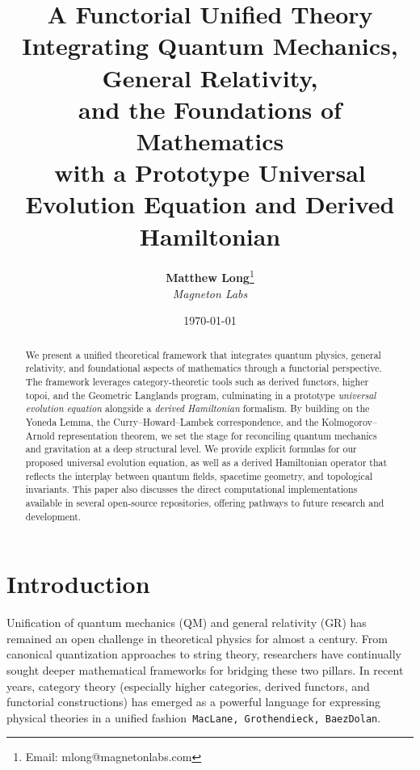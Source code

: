 \documentclass[11pt]{article}
\title{\textbf{A Functorial Unified Theory Integrating Quantum Mechanics, General Relativity,\\
and the Foundations of Mathematics\\
\large with a Prototype Universal Evolution Equation and Derived Hamiltonian}}
\author{
  \textbf{Matthew Long}\thanks{Email: mlong@magnetonlabs.com} \\
  \textit{Magneton Labs}
}
\date{\today}
\begin{document}
\maketitle

\begin{abstract}
We present a unified theoretical framework that integrates quantum physics, general relativity, and foundational aspects of mathematics through a functorial perspective. The framework leverages category-theoretic tools such as derived functors, higher topoi, and the Geometric Langlands program, culminating in a prototype \emph{universal evolution equation} alongside a \emph{derived Hamiltonian} formalism. By building on the Yoneda Lemma, the Curry--Howard--Lambek correspondence, and the Kolmogorov--Arnold representation theorem, we set the stage for reconciling quantum mechanics and gravitation at a deep structural level. We provide explicit formulas for our proposed universal evolution equation, as well as a derived Hamiltonian operator that reflects the interplay between quantum fields, spacetime geometry, and topological invariants. This paper also discusses the direct computational implementations available in several open-source repositories, offering pathways to future research and development. 
\end{abstract}

\tableofcontents

\section{Introduction}
\label{sec:intro}

Unification of quantum mechanics (QM) and general relativity (GR) has remained an open challenge in theoretical physics for almost a century. From canonical quantization approaches to string theory, researchers have continually sought deeper mathematical frameworks for bridging these two pillars. In recent years, category theory (especially higher categories, derived functors, and functorial constructions) has emerged as a powerful language for expressing physical theories in a unified fashion~\texttt{MacLane, Grothendieck, BaezDolan}.
\end{document}

